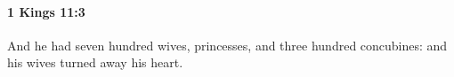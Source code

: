 
		\paragraph{1 Kings 11:3} %
			\label{1KINGS-11-3}

			And he had seven hundred wives, princesses, and three hundred concubines: and his wives turned away his heart.


